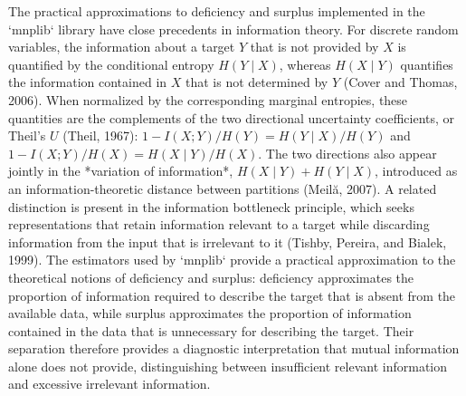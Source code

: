 





The practical approximations to deficiency and surplus implemented in the `mnplib` library have close precedents in information theory. For discrete random variables, the information about a target \(Y\) that is not provided by \(X\) is quantified by the conditional entropy \(H(Y\mid X)\), whereas \(H(X\mid Y)\) quantifies the information contained in \(X\) that is not determined by \(Y\) (Cover and Thomas, 2006). When normalized by the corresponding marginal entropies, these quantities are the complements of the two directional uncertainty coefficients, or Theil's \(U\) (Theil, 1967): \(1-I(X;Y)/H(Y)=H(Y\mid X)/H(Y)\) and \(1-I(X;Y)/H(X)=H(X\mid Y)/H(X)\). The two directions also appear jointly in the *variation of information*, \(H(X\mid Y)+H(Y\mid X)\), introduced as an information-theoretic distance between partitions (Meilă, 2007). A related distinction is present in the information bottleneck principle, which seeks representations that retain information relevant to a target while discarding information from the input that is irrelevant to it (Tishby, Pereira, and Bialek, 1999). The estimators used by `mnplib` provide a practical approximation to the theoretical notions of deficiency and surplus: deficiency approximates the proportion of information required to describe the target that is absent from the available data, while surplus approximates the proportion of information contained in the data that is unnecessary for describing the target. Their separation therefore provides a diagnostic interpretation that mutual information alone does not provide, distinguishing between insufficient relevant information and excessive irrelevant information.


